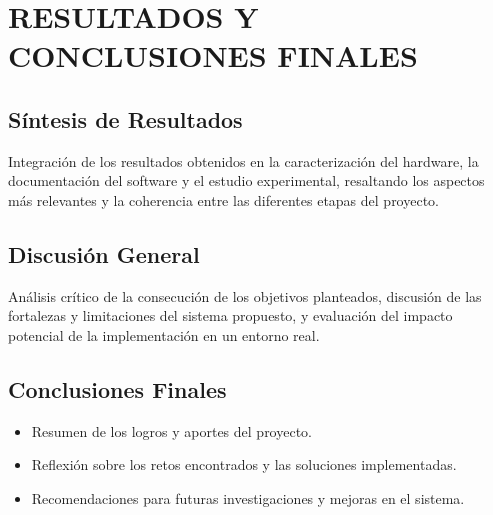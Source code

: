 \chapter{RESULTADOS Y CONCLUSIONES FINALES}

\section{Síntesis de Resultados}
Integración de los resultados obtenidos en la caracterización del hardware, la documentación del software y el estudio experimental, resaltando los aspectos más relevantes y la coherencia entre las diferentes etapas del proyecto.

\section{Discusión General}
Análisis crítico de la consecución de los objetivos planteados, discusión de las fortalezas y limitaciones del sistema propuesto, y evaluación del impacto potencial de la implementación en un entorno real.

\section{Conclusiones Finales}
\begin{itemize}
    \item Resumen de los logros y aportes del proyecto.
    \item Reflexión sobre los retos encontrados y las soluciones implementadas.
    \item Recomendaciones para futuras investigaciones y mejoras en el sistema.
\end{itemize}